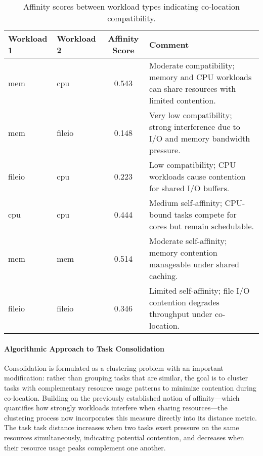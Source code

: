 \begin{table}[H]
    \centering
    \caption{Affinity scores between workload types indicating co-location compatibility.}
    \label{tab:affinity_scores}
    \begin{tabularx}{\textwidth}{l l c X}
        \toprule
        \textbf{Workload 1} & \textbf{Workload 2} & \textbf{Affinity Score} & \textbf{Comment}                                                                              \\
        \midrule
        mem                 & cpu                 & 0.543                   & Moderate compatibility; memory and CPU workloads can share resources with limited contention. \\
        mem                 & fileio              & 0.148                   & Very low compatibility; strong interference due to I/O and memory bandwidth pressure.         \\
        fileio              & cpu                 & 0.223                   & Low compatibility; CPU workloads cause contention for shared I/O buffers.                     \\
        cpu                 & cpu                 & 0.444                   & Medium self-affinity; CPU-bound tasks compete for cores but remain schedulable.               \\
        mem                 & mem                 & 0.514                   & Moderate self-affinity; memory contention manageable under shared caching.                    \\
        fileio              & fileio              & 0.346                   & Limited self-affinity; file I/O contention degrades throughput under co-location.             \\
        \bottomrule
    \end{tabularx}
\end{table}

\paragraph{Algorithmic Approach to Task Consolidation}
Consolidation is formulated as a clustering problem with an important modification: rather than grouping tasks that are similar, the goal is to cluster tasks with complementary resource usage patterns to minimize contention during co-location. Building on the previously established notion of affinity—which quantifies how strongly workloads interfere when sharing resources—the clustering process now incorporates this measure directly into its distance metric. The task task distance increases when two tasks exert pressure on the same resources simultaneously, indicating potential contention, and decreases when their resource usage peaks complement one another.

